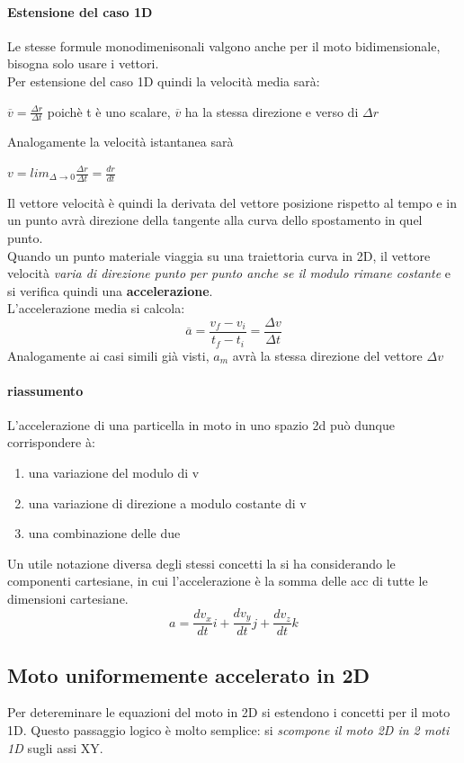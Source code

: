 \documentclass[12pt, a4paper, openany]{book}
\begin{document}
\paragraph*{Estensione del caso 1D} Le stesse formule monodimenisonali valgono anche per il moto bidimensionale, bisogna solo usare i vettori.
\\Per estensione del caso 1D quindi la velocità media sarà:
\begin{center}
    $\overline{v} = \frac{\Delta r}{\Delta t}$ poichè t è uno scalare, $\overline{v}$ ha la stessa direzione e verso di $\Delta r$
\end{center}
Analogamente la velocità istantanea sarà
\begin{center}
    $v = lim_{\Delta \to 0 } \frac{\Delta r}{\Delta t} = \frac{dr}{dt}$
\end{center}
Il vettore velocità è quindi la derivata del vettore posizione rispetto al tempo e in un punto avrà direzione della tangente
alla curva dello spostamento in quel punto.
\\Quando un punto materiale viaggia su una traiettoria curva in 2D, il vettore velocità \emph{varia di direzione punto per punto anche se il modulo rimane costante} e si verifica quindi una \textbf{accelerazione}.
\\L'accelerazione media si calcola:
\[\overline{a}=\frac{v_f-v_i}{t_f-t_i}= \frac{\Delta v}{\Delta t}\]
Analogamente ai casi simili già visti, $a_m$ avrà la stessa direzione del vettore $\Delta v$
\paragraph*{riassumento}L'accelerazione di una particella in moto in uno spazio 2d può dunque corrispondere à:
\begin{enumerate}
    \item una variazione del modulo di v
    \item una variazione di direzione a modulo costante di v
    \item una combinazione delle due
\end{enumerate}
Un utile notazione diversa degli stessi concetti la si ha considerando le componenti cartesiane, in cui l'accelerazione è la somma delle acc di tutte le dimensioni cartesiane.
$$ a = \frac{dv_x}{dt}i + \frac{dv_y}{dt}j + \frac{dv_z}{dt}k $$
\subsection*{Moto uniformemente accelerato in 2D}
Per detereminare le equazioni del moto in 2D si estendono i concetti per il moto 1D.
Questo passaggio logico è molto semplice: si \emph{scompone il moto 2D in 2 moti 1D} sugli assi XY.
\end{document}
